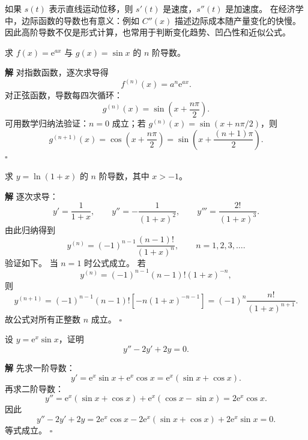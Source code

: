 \documentclass[fontset=fandol]{ctexart}
\newenvironment{solution}{\par\noindent\textbf{解}\quad}{\hfill$\square$\par\vspace{0.8em}}
\newcommand{\ee}{\mathrm{e}}
\begin{document}
如果 $s(t)$ 表示直线运动位移，则 $s'(t)$ 是速度，$s''(t)$ 是加速度。 在经济学中，边际函数的导数也有意义：例如 $C''(x)$ 描述边际成本随产量变化的快慢。 因此高阶导数不仅是形式计算，也常用于判断变化趋势、凹凸性和近似公式。

\begin{example}[常用函数高阶导数]
求 $f(x)=\ee^{ax}$ 与 $g(x)=\sin x$ 的 $n$ 阶导数。
\end{example}
\begin{solution}
对指数函数，逐次求导得
\[
f^{(n)}(x)=a^n\ee^{ax}.
\]
对正弦函数，导数每四次循环：
\[
g^{(n)}(x)=\sin\left(x+\frac{n\pi}{2}\right).
\]
可用数学归纳法验证：$n=0$ 成立；若 $g^{(n)}(x)=\sin(x+n\pi/2)$，则
\[
g^{(n+1)}(x)=\cos\left(x+\frac{n\pi}{2}\right)=\sin\left(x+\frac{(n+1)\pi}{2}\right).
\]
\end{solution}

\begin{example}[对数函数的高阶导数]
求 $y=\ln(1+x)$ 的 $n$ 阶导数，其中 $x>-1$。
\end{example}
\begin{solution}
逐次求导：
\[
y'=\frac1{1+x},\qquad
y''=-\frac1{(1+x)^2},\qquad
y'''=\frac{2!}{(1+x)^3}.
\]
由此归纳得到
\[
y^{(n)}=(-1)^{n-1}\frac{(n-1)!}{(1+x)^n},\qquad n=1,2,3,\ldots.
\]
验证如下。 当 $n=1$ 时公式成立。 若
\[
y^{(n)}=(-1)^{n-1}(n-1)!(1+x)^{-n},
\]
则
\[
y^{(n+1)}
=(-1)^{n-1}(n-1)![-n(1+x)^{-n-1}]
=(-1)^n\frac{n!}{(1+x)^{n+1}}.
\]
故公式对所有正整数 $n$ 成立。
\end{solution}

\begin{example}[验证二阶导数关系]
设 $y=\ee^x\sin x$，证明
\[
y''-2y'+2y=0.
\]
\end{example}
\begin{solution}
先求一阶导数：
\[
y'=\ee^x\sin x+\ee^x\cos x=\ee^x(\sin x+\cos x).
\]
再求二阶导数：
\[
y''=\ee^x(\sin x+\cos x)+\ee^x(\cos x-\sin x)=2\ee^x\cos x.
\]
因此
\[
y''-2y'+2y
=2\ee^x\cos x-2\ee^x(\sin x+\cos x)+2\ee^x\sin x=0.
\]
等式成立。
\end{solution}
\end{document}
